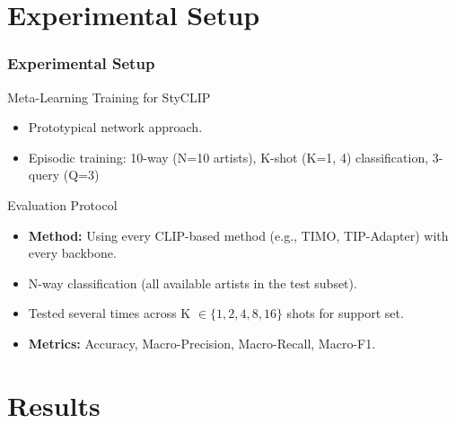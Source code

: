 \documentclass[aspectratio=169,xcolor=dvipsnames]{beamer}
\begin{document}
\section{Experimental Setup}
\begin{frame}
  \frametitle{Experimental Setup}
  \begin{block}{Meta-Learning Training for StyCLIP}
    \begin{itemize}
      \item Prototypical network approach.
      \item Episodic training: 10-way (N=10 artists), K-shot (K=1, 4) classification, 3-query (Q=3)
    \end{itemize}
  \end{block}

  \begin{block}{Evaluation Protocol}
    \begin{itemize}
      \item \textbf{Method:} Using every CLIP-based method (e.g., TIMO, TIP-Adapter) with every backbone.
      \item N-way classification (all available artists in the test subset).
      \item Tested several times across K $\in \{1, 2, 4, 8, 16\}$ shots for support set.
      \item \textbf{Metrics:} Accuracy, Macro-Precision, Macro-Recall, Macro-F1.
    \end{itemize}
  \end{block}
\end{frame}



\section{Results}
\end{document}
